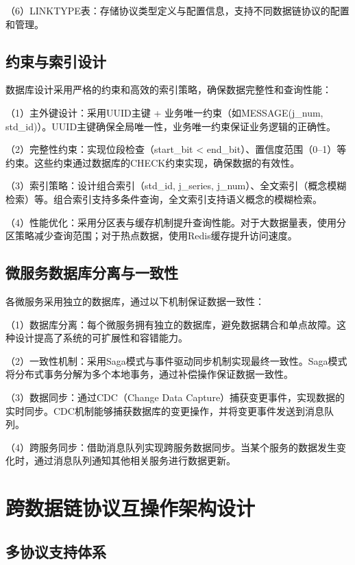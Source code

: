 （6）LINKTYPE表：存储协议类型定义与配置信息，支持不同数据链协议的配置和管理。

\subsection{约束与索引设计}

数据库设计采用严格的约束和高效的索引策略，确保数据完整性和查询性能：

（1）主外键设计：采用UUID主键 + 业务唯一约束（如MESSAGE(j\_num, std\_id)）。UUID主键确保全局唯一性，业务唯一约束保证业务逻辑的正确性。

（2）完整性约束：实现位段检查（start\_bit < end\_bit）、置信度范围（0–1）等约束。这些约束通过数据库的CHECK约束实现，确保数据的有效性。

（3）索引策略：设计组合索引（std\_id, j\_series, j\_num）、全文索引（概念模糊检索）等。组合索引支持多条件查询，全文索引支持语义概念的模糊检索。

（4）性能优化：采用分区表与缓存机制提升查询性能。对于大数据量表，使用分区策略减少查询范围；对于热点数据，使用Redis缓存提升访问速度。

\subsection{微服务数据库分离与一致性}

各微服务采用独立的数据库，通过以下机制保证数据一致性：

（1）数据库分离：每个微服务拥有独立的数据库，避免数据耦合和单点故障。这种设计提高了系统的可扩展性和容错能力。

（2）一致性机制：采用Saga模式与事件驱动同步机制实现最终一致性。Saga模式将分布式事务分解为多个本地事务，通过补偿操作保证数据一致性。

（3）数据同步：通过CDC（Change Data Capture）捕获变更事件，实现数据的实时同步。CDC机制能够捕获数据库的变更操作，并将变更事件发送到消息队列。

（4）跨服务同步：借助消息队列实现跨服务数据同步。当某个服务的数据发生变化时，通过消息队列通知其他相关服务进行数据更新。

\section{跨数据链协议互操作架构设计}

\subsection{多协议支持体系}

